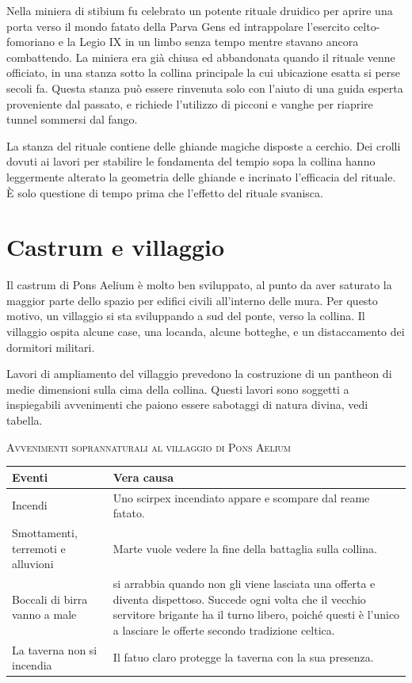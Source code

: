 \documentclass[11.5pt,twocolumn]{article}
\newcommand\minio{Minio Matholwch}
\begin{document}
Nella miniera di stibium fu celebrato un potente rituale druidico per aprire una porta verso il mondo fatato della Parva Gens ed intrappolare l'esercito celto-fomoriano e la Legio IX in un limbo senza tempo mentre stavano ancora combattendo.
La miniera era gi\`{a} chiusa ed abbandonata quando il rituale venne officiato, in una stanza sotto la collina principale la cui ubicazione esatta si perse secoli fa.
Questa stanza pu\`{o} essere rinvenuta solo con l'aiuto di una guida esperta proveniente dal passato, e richiede l'utilizzo di picconi e vanghe per riaprire tunnel sommersi dal fango.

La stanza del rituale contiene delle ghiande magiche disposte a cerchio.
Dei crolli dovuti ai lavori per stabilire le fondamenta del tempio sopa la collina hanno leggermente alterato la geometria delle ghiande e incrinato l'efficacia del rituale.
\`{E} solo questione di tempo prima che l'effetto del rituale svanisca.

\section{Castrum e villaggio}
%
Il castrum di Pons Aelium \`{e} molto ben sviluppato, al punto da aver saturato la maggior parte dello spazio per edifici civili all'interno delle mura.
Per questo motivo, un villaggio si sta sviluppando a sud del ponte, verso la collina.
Il villaggio ospita alcune case, una locanda, alcune botteghe, e un distaccamento dei dormitori militari.

Lavori di ampliamento del villaggio prevedono la costruzione di un pantheon di medie dimensioni sulla cima della collina.
Questi lavori sono soggetti a inspiegabili avvenimenti che paiono essere sabotaggi di natura divina, vedi tabella.

\begin{table}[tb]
\begin{infobox}
\begin{center}
\textsc{Avvenimenti soprannaturali al villaggio di Pons Aelium}
\vspace{1em}
\end{center}
\begin{tabular}{| m{} m{} |}
\hline
\textbf{Eventi} & \textbf{Vera causa} \\
\hline
Incendi &
Uno scirpex incendiato appare e scompare dal reame fatato.
\\
\hline
Smottamenti, terremoti e alluvioni &
Marte vuole vedere la fine della battaglia sulla collina.
\\
\hline
Boccali di birra vanno a male &
\monsterref{\minio} si arrabbia quando non gli viene lasciata una offerta e diventa dispettoso.
Succede ogni volta che il vecchio servitore brigante ha il turno libero, poich\'{e} questi \`{e} l'unico a lasciare le offerte secondo tradizione celtica.
\\
\hline
La taverna non si incendia &
Il fatuo claro protegge la taverna con la sua presenza.
\\
\hline
\end{tabular}
\end{infobox}
\end{table}
\end{document}
